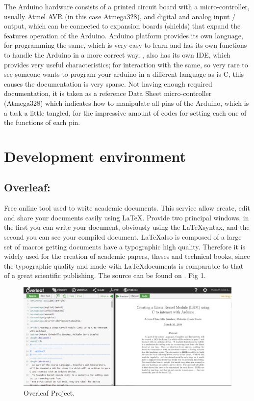 \documentclass[12pt]{article}
\begin{document}
The Arduino hardware consists of a printed circuit board with a micro-controller, usually Atmel AVR (in this case Atmega328), and digital and analog input / output, which can be connected to expansion boards (shields) that expand the features operation of the Arduino.
Arduino platform provides its own language, for programming the same, which is very easy to learn and has its own functions to handle the Arduino in a more correct way, , also has its own IDE, which provides very useful characteristics; for interaction with the same, so very rare to see someone wants to program your arduino in a different language as is C, this causes the documentation is very sparse. Not having enough required documentation, it is taken as a reference Data Sheet micro-controller (Atmega328) which indicates how to manipulate all pins of the Arduino, which is a task a little tangled, for the impressive amount of codes for setting each one of the functions of each pin.
\section{Development environment}
\subsection{Overleaf:}
Free online tool used to write academic documents. This service allow create, edit and share your documents easily using \LaTeX. Provide two principal windows, in the first you can write your document, obviously using the \LaTeX syntax, and the second you can see your compiled document. \LaTeX also is composed of a large set of macros getting documents have a typographic high quality. Therefore it is widely used for the creation of academic papers, theses and technical books, since the typographic quality and made with \LaTeX documents is comparable to that of a great scientific publishing. The source can be found on \cite{Chin-Dav16a}. Fig 1.
\begin{figure}[h!]
 	\centering
  	\includegraphics[scale=0.4]
  	{Fig/Inception.png}    
  	\caption{Overleaf Project.}
\end{figure}
\end{document}
